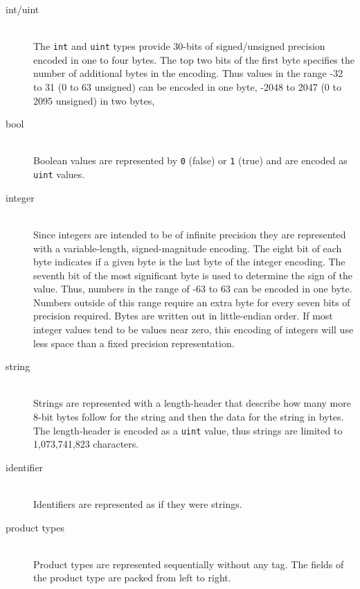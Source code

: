\begin{description}
  \item[int/uint] \mbox{}\\
    The \lstinline!int! and \lstinline!uint! types provide 30-bits of signed/unsigned
    precision encoded in one to four bytes.
    The top two bits of the first byte specifies the number of additional bytes in
    the encoding.
    Thus values in the range -32 to 31 (0 to 63 unsigned) can be encoded in one byte,
    -2048 to 2047 (0 to 2095 unsigned) in two bytes, \etc{}

  \item[bool] \mbox{}\\
    Boolean values are represented by \lstinline!0! (false) or \lstinline!1! (true)
    and are encoded as \lstinline!uint! values.

  \item[integer] \mbox{}\\
    Since \asdl{} integers are intended to be of infinite precision they are
    represented with a variable-length, signed-magnitude encoding.
    The eight bit of each byte indicates if a given byte is the last byte of
    the integer encoding.
    The seventh bit of the most significant byte is used to determine the
    sign of the value.
    Thus, numbers in the range of -63 to 63 can be encoded in one byte.
    Numbers outside of this range require an extra byte for every seven bits
    of precision required.
    Bytes are written out in little-endian order.
    If most integer values tend to be values near zero, this encoding of integers
    will use less space than a fixed precision representation.

  \item[string] \mbox{}\\
    Strings are represented with a length-header that describe how many more
    8-bit bytes follow for the string and then the data for the string in bytes.
    The length-header is encoded as a \lstinline!uint! value, thus strings are limited
    to 1,073,741,823 characters.

  \item[identifier] \mbox{}\\
    Identifiers are represented as if they were strings. 

  \item[product types] \mbox{}\\ 
    Product types are represented sequentially without any tag.
    The fields of the product type are packed from left to right.


\end{description}
